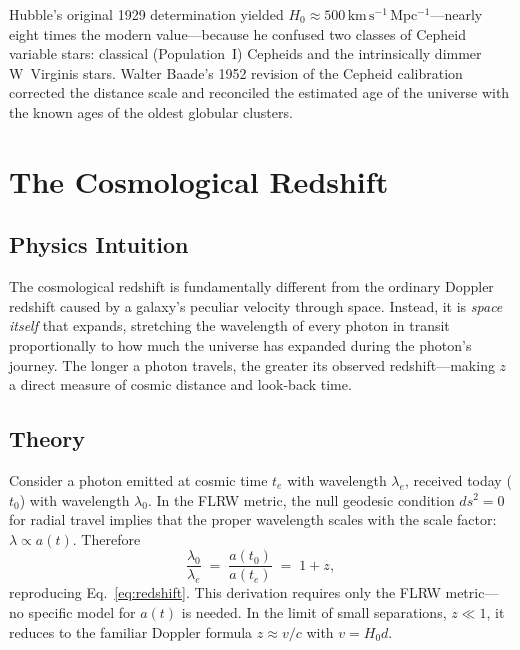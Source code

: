 \begin{extra}
Hubble's original 1929 determination yielded $H_0 \approx 500\,\mathrm{km\,s^{-1}\,Mpc^{-1}}$—nearly
eight times the modern value—because he confused two classes of Cepheid variable stars:
classical (Population~I) Cepheids and the intrinsically dimmer W~Virginis stars.
Walter Baade's 1952 revision of the Cepheid calibration corrected the distance scale and
reconciled the estimated age of the universe with the known ages of the oldest globular clusters.
\end{extra}

\section{The Cosmological Redshift}

\subsection{Physics Intuition}

\begin{intuition}
The cosmological redshift is fundamentally different from the ordinary Doppler
redshift caused by a galaxy's peculiar velocity through space.
Instead, it is \emph{space itself} that expands, stretching the wavelength of every
photon in transit proportionally to how much the universe has expanded during the photon's
journey. The longer a photon travels, the greater its observed redshift—making $z$ a
direct measure of cosmic distance and look-back time.
\end{intuition}

\subsection{Theory}

\begin{theory}
Consider a photon emitted at cosmic time $t_e$ with wavelength $\lambda_e$, received
today ($t_0$) with wavelength $\lambda_0$.
In the FLRW metric, the null geodesic condition $ds^2=0$ for radial travel implies
that the proper wavelength scales with the scale factor:
$\lambda \propto a(t)$.
Therefore
\begin{equation}
  \frac{\lambda_0}{\lambda_e} \;=\; \frac{a(t_0)}{a(t_e)} \;=\; 1 + z,
\end{equation}
reproducing Eq.~\eqref{eq:redshift}.
This derivation requires only the FLRW metric—no specific model for $a(t)$ is needed.
In the limit of small separations, $z \ll 1$, it reduces to the familiar Doppler
formula $z \approx v/c$ with $v = H_0 d$.
\end{theory}

